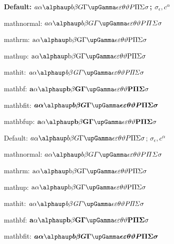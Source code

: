 \documentclass[12pt, a4paper, oneside]{article}
\newcommand{\mathup}[1]{\mathrm{#1}}
\newcommand{\mathbfit}[1]{\bm{#1}}
\newcommand{\mathbfup}[1]{\mathbf{#1}}
\theoremstyle{Plain}
\theoremstyle{Definition}
\theoremstyle{Remark}
\begin{document}
\begin{appendix}
{\bigskip

{\bfseries
Default: $a \alpha \alphaup b \beta G \Gamma \upGamma \epsilon \varepsilon \theta \vartheta P \Pi \Sigma \sigma$; $\sigma_\epsilon, c^\alpha$

mathnormal: $\mathnormal{a \alpha \alphaup b \beta G \Gamma \upGamma \epsilon \varepsilon \theta \vartheta P \Pi \Sigma \sigma}$

mathrm: $\mathrm{a \alpha \alphaup b \beta G \Gamma \upGamma \epsilon \varepsilon \theta \vartheta P \Pi \Sigma \sigma}$

mathup: $\mathup{a \alpha \alphaup b \beta G \Gamma \upGamma \epsilon \varepsilon \theta \vartheta P \Pi \Sigma \sigma}$

mathit: $\mathit{a \alpha \alphaup b \beta G \Gamma \upGamma \epsilon \varepsilon \theta \vartheta P \Pi \Sigma \sigma}$

mathbf: $\mathbf{a \alpha \alphaup b \beta G \Gamma \upGamma \epsilon \varepsilon \theta \vartheta P \Pi \Sigma \sigma}$

mathbfit: $\mathbfit{a \alpha \alphaup b \beta G \Gamma \upGamma \epsilon \varepsilon \theta \vartheta P \Pi \Sigma \sigma}$

mathbfup: $\mathbfup{a \alpha \alphaup b \beta G \Gamma \upGamma \epsilon \varepsilon \theta \vartheta P \Pi \Sigma \sigma}$
}

\bigskip

{\sffamily\mdseries
Default: $a \alpha \alphaup b \beta G \Gamma \upGamma \epsilon \varepsilon \theta \vartheta P \Pi \Sigma \sigma$; $\sigma_\epsilon, c^\alpha$

mathnormal: $\mathnormal{a \alpha \alphaup b \beta G \Gamma \upGamma \epsilon \varepsilon \theta \vartheta P \Pi \Sigma \sigma}$

mathrm: $\mathrm{a \alpha \alphaup b \beta G \Gamma \upGamma \epsilon \varepsilon \theta \vartheta P \Pi \Sigma \sigma}$

mathup: $\mathup{a \alpha \alphaup b \beta G \Gamma \upGamma \epsilon \varepsilon \theta \vartheta P \Pi \Sigma \sigma}$

mathit: $\mathit{a \alpha \alphaup b \beta G \Gamma \upGamma \epsilon \varepsilon \theta \vartheta P \Pi \Sigma \sigma}$

mathbf: $\mathbf{a \alpha \alphaup b \beta G \Gamma \upGamma \epsilon \varepsilon \theta \vartheta P \Pi \Sigma \sigma}$

mathbfit: $\mathbfit{a \alpha \alphaup b \beta G \Gamma \upGamma \epsilon \varepsilon \theta \vartheta P \Pi \Sigma \sigma}$

}}
\end{appendix}
\end{document}
